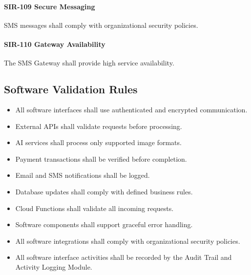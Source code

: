 \paragraph{SIR-109 Secure Messaging}

SMS messages shall comply with organizational security policies.

\paragraph{SIR-110 Gateway Availability}

The SMS Gateway shall provide high service availability.


\subsection*{Software Validation Rules}

\begin{itemize}

\item All software interfaces shall use authenticated and encrypted
communication.

\item External APIs shall validate requests before processing.

\item AI services shall process only supported image formats.

\item Payment transactions shall be verified before completion.

\item Email and SMS notifications shall be logged.

\item Database updates shall comply with defined business rules.

\item Cloud Functions shall validate all incoming requests.

\item Software components shall support graceful error handling.

\item All software integrations shall comply with organizational
security policies.

\item All software interface activities shall be recorded by the Audit
Trail and Activity Logging Module.

\end{itemize}

